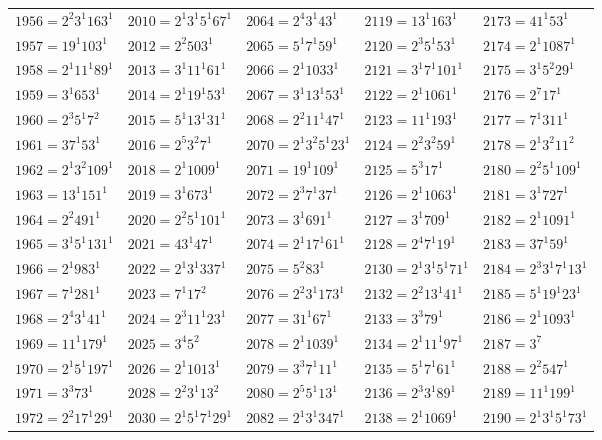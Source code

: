 {\begin{longtable}[c]{*{5}{l}}
$1956=2^{2}3^{1}163^{1}$&$2010=2^{1}3^{1}5^{1}67^{1}$&$2064=2^{4}3^{1}43^{1}$&$2119=13^{1}163^{1}$&$2173=41^{1}53^{1}$\\
$1957=19^{1}103^{1}$&$2012=2^{2}503^{1}$&$2065=5^{1}7^{1}59^{1}$&$2120=2^{3}5^{1}53^{1}$&$2174=2^{1}1087^{1}$\\
$1958=2^{1}11^{1}89^{1}$&$2013=3^{1}11^{1}61^{1}$&$2066=2^{1}1033^{1}$&$2121=3^{1}7^{1}101^{1}$&$2175=3^{1}5^{2}29^{1}$\\
$1959=3^{1}653^{1}$&$2014=2^{1}19^{1}53^{1}$&$2067=3^{1}13^{1}53^{1}$&$2122=2^{1}1061^{1}$&$2176=2^{7}17^{1}$\\
$1960=2^{3}5^{1}7^{2}$&$2015=5^{1}13^{1}31^{1}$&$2068=2^{2}11^{1}47^{1}$&$2123=11^{1}193^{1}$&$2177=7^{1}311^{1}$\\
$1961=37^{1}53^{1}$&$2016=2^{5}3^{2}7^{1}$&$2070=2^{1}3^{2}5^{1}23^{1}$&$2124=2^{2}3^{2}59^{1}$&$2178=2^{1}3^{2}11^{2}$\\
$1962=2^{1}3^{2}109^{1}$&$2018=2^{1}1009^{1}$&$2071=19^{1}109^{1}$&$2125=5^{3}17^{1}$&$2180=2^{2}5^{1}109^{1}$\\
$1963=13^{1}151^{1}$&$2019=3^{1}673^{1}$&$2072=2^{3}7^{1}37^{1}$&$2126=2^{1}1063^{1}$&$2181=3^{1}727^{1}$\\
$1964=2^{2}491^{1}$&$2020=2^{2}5^{1}101^{1}$&$2073=3^{1}691^{1}$&$2127=3^{1}709^{1}$&$2182=2^{1}1091^{1}$\\
$1965=3^{1}5^{1}131^{1}$&$2021=43^{1}47^{1}$&$2074=2^{1}17^{1}61^{1}$&$2128=2^{4}7^{1}19^{1}$&$2183=37^{1}59^{1}$\\
$1966=2^{1}983^{1}$&$2022=2^{1}3^{1}337^{1}$&$2075=5^{2}83^{1}$&$2130=2^{1}3^{1}5^{1}71^{1}$&$2184=2^{3}3^{1}7^{1}13^{1}$\\
$1967=7^{1}281^{1}$&$2023=7^{1}17^{2}$&$2076=2^{2}3^{1}173^{1}$&$2132=2^{2}13^{1}41^{1}$&$2185=5^{1}19^{1}23^{1}$\\
$1968=2^{4}3^{1}41^{1}$&$2024=2^{3}11^{1}23^{1}$&$2077=31^{1}67^{1}$&$2133=3^{3}79^{1}$&$2186=2^{1}1093^{1}$\\
$1969=11^{1}179^{1}$&$2025=3^{4}5^{2}$&$2078=2^{1}1039^{1}$&$2134=2^{1}11^{1}97^{1}$&$2187=3^{7}$\\
$1970=2^{1}5^{1}197^{1}$&$2026=2^{1}1013^{1}$&$2079=3^{3}7^{1}11^{1}$&$2135=5^{1}7^{1}61^{1}$&$2188=2^{2}547^{1}$\\
$1971=3^{3}73^{1}$&$2028=2^{2}3^{1}13^{2}$&$2080=2^{5}5^{1}13^{1}$&$2136=2^{3}3^{1}89^{1}$&$2189=11^{1}199^{1}$\\
$1972=2^{2}17^{1}29^{1}$&$2030=2^{1}5^{1}7^{1}29^{1}$&$2082=2^{1}3^{1}347^{1}$&$2138=2^{1}1069^{1}$&$2190=2^{1}3^{1}5^{1}73^{1}$\\

\end{longtable}}
